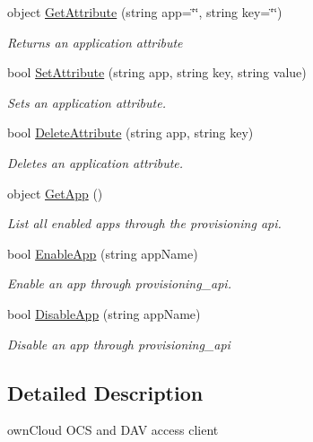 \begin{DoxyCompactItemize}
object \hyperlink{classowncloudsharp_1_1_client_afb8ad7cb10feb92462a4792661654537}{Get\+Attribute} (string app=\char`\"{}\char`\"{}, string key=\char`\"{}\char`\"{})
\begin{DoxyCompactList}\small\item\em Returns an application attribute \end{DoxyCompactList}\item 
bool \hyperlink{classowncloudsharp_1_1_client_a0939782439f44c5250d66147755d4c25}{Set\+Attribute} (string app, string key, string value)
\begin{DoxyCompactList}\small\item\em Sets an application attribute. \end{DoxyCompactList}\item 
bool \hyperlink{classowncloudsharp_1_1_client_ad94e83b297c9de310beafd878fd99bc4}{Delete\+Attribute} (string app, string key)
\begin{DoxyCompactList}\small\item\em Deletes an application attribute. \end{DoxyCompactList}\item 
object \hyperlink{classowncloudsharp_1_1_client_ad781c23e20eee028f3b05ffd722b8c27}{Get\+App} ()
\begin{DoxyCompactList}\small\item\em List all enabled apps through the provisioning api. \end{DoxyCompactList}\item 
bool \hyperlink{classowncloudsharp_1_1_client_a4023a60f6fa18288d4b9cf8cba705e7c}{Enable\+App} (string app\+Name)
\begin{DoxyCompactList}\small\item\em Enable an app through provisioning\+\_\+api. \end{DoxyCompactList}\item 
bool \hyperlink{classowncloudsharp_1_1_client_a77306ba08609c9cf128e62b955227648}{Disable\+App} (string app\+Name)
\begin{DoxyCompactList}\small\item\em Disable an app through provisioning\+\_\+api \end{DoxyCompactList}\end{DoxyCompactItemize}


\subsection{Detailed Description}
own\+Cloud O\+C\+S and D\+A\+V access client 



